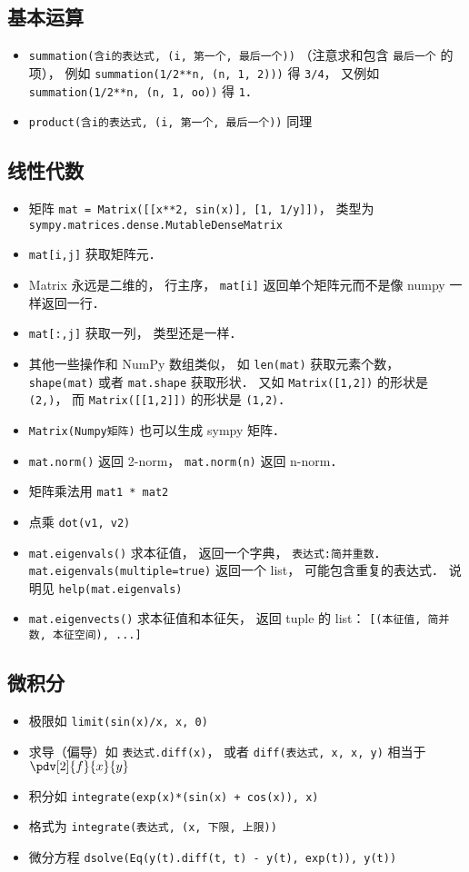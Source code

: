 \subsection{基本运算}
\begin{itemize}
\item \verb|summation(含i的表达式, (i, 第一个, 最后一个))| （注意求和包含 \verb|最后一个| 的项）， 例如 \verb|summation(1/2**n, (n, 1, 2)))| 得 \verb|3/4|， 又例如 \verb|summation(1/2**n, (n, 1, oo))| 得 \verb|1|．
\item \verb|product(含i的表达式, (i, 第一个, 最后一个))| 同理
\end{itemize}

\subsection{线性代数}
\begin{itemize}
\item 矩阵 \verb|mat = Matrix([[x**2, sin(x)], [1, 1/y]])|， 类型为 \verb|sympy.matrices.dense.MutableDenseMatrix|
\item \verb|mat[i,j]| 获取矩阵元．
\item Matrix 永远是二维的， 行主序， \verb|mat[i]| 返回单个矩阵元而不是像 numpy 一样返回一行．
\item \verb|mat[:,j]| 获取一列， 类型还是一样．
\item 其他一些操作和 NumPy 数组类似， 如 \verb|len(mat)| 获取元素个数， \verb|shape(mat)| 或者 \verb|mat.shape| 获取形状． 又如 \verb|Matrix([1,2])| 的形状是 \verb|(2,)|， 而 \verb|Matrix([[1,2]])| 的形状是 \verb|(1,2)|．
\item \verb|Matrix(Numpy矩阵)| 也可以生成 sympy 矩阵．
\item \verb|mat.norm()| 返回 2-norm， \verb|mat.norm(n)| 返回 n-norm．
\item 矩阵乘法用 \verb|mat1 * mat2|
\item 点乘 \verb|dot(v1, v2)|
\item \verb|mat.eigenvals()| 求本征值， 返回一个字典， \verb|表达式:简并重数|． \verb|mat.eigenvals(multiple=true)| 返回一个 list， 可能包含重复的表达式． 说明见 \verb|help(mat.eigenvals)|
\item \verb|mat.eigenvects()| 求本征值和本征矢， 返回 tuple 的 list： \verb|[(本征值, 简并数, 本征空间), ...]|
\end{itemize}


\subsection{微积分}
\begin{itemize}
\item 极限如 \verb|limit(sin(x)/x, x, 0)|
\item 求导（偏导）如 \verb|表达式.diff(x)|， 或者 \verb|diff(表达式, x, x, y)| 相当于 $\pdv[2]{f}{x}{y}$
\item 积分如 \verb|integrate(exp(x)*(sin(x) + cos(x)), x)|
\item 格式为 \verb|integrate(表达式, (x, 下限, 上限))|
\item 微分方程 \verb|dsolve(Eq(y(t).diff(t, t) - y(t), exp(t)), y(t))|
\end{itemize}


